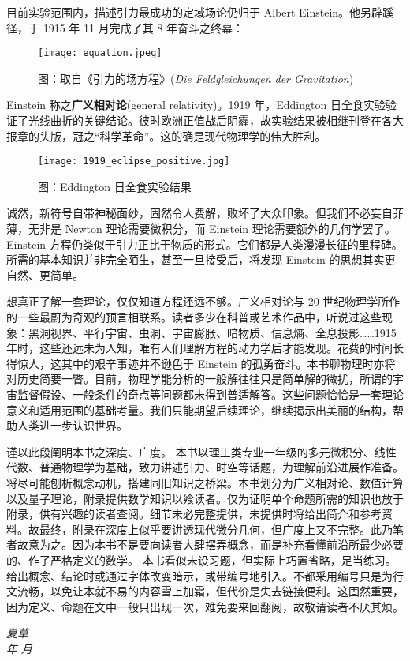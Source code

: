 目前实验范围内，描述引力最成功的定域场论仍归于 Albert Einstein。他另辟蹊径，于 1915 年 11 月完成了其 8 年奋斗之终幕：
\begin{figure}[ht]
    \centering
    \texttt{[image: equation.jpeg]}
    \caption*{\small 图：取自《引力的场方程》(\textit{Die Feldgleichungen der Gravitation})}
\end{figure}

\noindent Einstein 称之\textbf{广义相对论}(general relativity)。1919 年，Eddington 日全食实验验证了光线曲折的关键结论。彼时欧洲正值战后阴霾，故实验结果被相继刊登在各大报章的头版，冠之“科学革命”。这的确是现代物理学的伟大胜利。
\begin{figure}[ht]
    \centering
    \texttt{[image: 1919\_eclipse\_positive.jpg]}
    \caption*{\small 图：Eddington 日全食实验结果}
\end{figure}
诚然，新符号自带神秘面纱，固然令人费解，败坏了大众印象。但我们不必妄自菲薄，无非是 Newton 理论需要微积分，而 Einstein 理论需要额外的几何学罢了。Einstein 方程仍类似于引力正比于物质的形式。它们都是人类漫漫长征的里程碑。所需的基本知识并非完全陌生，甚至一旦接受后，将发现 Einstein 的思想其实更自然、更简单。

想真正了解一套理论，仅仅知道方程还远不够。广义相对论与 20 世纪物理学所作的一些最蔚为奇观的预言相联系。读者多少在科普或艺术作品中，听说过这些现象：黑洞视界、平行宇宙、虫洞、宇宙膨胀、暗物质、信息熵、全息投影……1915 年时，这些还远未为人知，唯有人们理解方程的动力学后才能发现。花费的时间长得惊人，这其中的艰辛事迹并不逊色于 Einstein 的孤勇奋斗。本书聊物理时亦将对历史简要一瞥。目前，物理学能分析的一般解往往只是简单解的微扰，所谓的宇宙监督假设、一般条件的奇点等问题都未得到普适解答。这些问题恰恰是一套理论意义和适用范围的基础考量。我们只能期望后续理论，继续揭示出美丽的结构，帮助人类进一步认识世界。

谨以此段阐明本书之深度、广度。
本书以理工类专业一年级的多元微积分、线性代数、普通物理学为基础，致力讲述引力、时空等话题，为理解前沿进展作准备。将尽可能刨析概念动机，搭建同旧知识之桥梁。本书划分为广义相对论、数值计算以及量子理论，附录提供数学知识以飨读者。仅为证明单个命题所需的知识也放于附录，供有兴趣的读者查阅。细节未必完整提供，未提供时将给出简介和参考资料。故最终，附录在深度上似乎要讲透现代微分几何，但广度上又不完整。此乃笔者故意为之。因为本书不是要向读者大肆摆弄概念，而是补充看懂前沿所最少必要的、作了严格定义的数学。
本书看似未设习题，但实际上巧置省略，足当练习。
给出概念、结论时或通过字体改变暗示，或带编号地引入。不都采用编号只是为行文流畅，以免让本就不易的内容雪上加霜，但代价是失去链接便利。这固然重要，因为定义、命题在文中一般只出现一次，难免要来回翻阅，故敬请读者不厌其烦。

\begin{flushright}
\textit{夏草}\\
\textit{\the\year 年 \the\month 月}
\end{flushright}
\label{preface}
